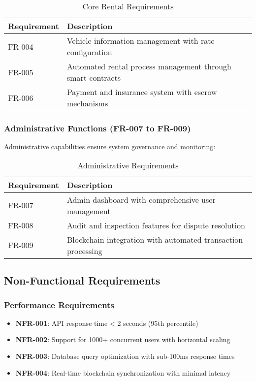 \documentclass[12pt,a4paper]{article}
\begin{document}
\begin{table}[H]
\centering
\begin{tabular}{|l|p{10cm}|}
\hline
\textbf{Requirement} & \textbf{Description} \\
\hline
FR-004 & Vehicle information management with rate configuration \\
FR-005 & Automated rental process management through smart contracts \\
FR-006 & Payment and insurance system with escrow mechanisms \\
\hline
\end{tabular}
\caption{Core Rental Requirements}
\end{table}

\subsubsection{Administrative Functions (FR-007 to FR-009)}
Administrative capabilities ensure system governance and monitoring:

\begin{table}[H]
\centering
\begin{tabular}{|l|p{10cm}|}
\hline
\textbf{Requirement} & \textbf{Description} \\
\hline
FR-007 & Admin dashboard with comprehensive user management \\
FR-008 & Audit and inspection features for dispute resolution \\
FR-009 & Blockchain integration with automated transaction processing \\
\hline
\end{tabular}
\caption{Administrative Requirements}
\end{table}

\subsection{Non-Functional Requirements}

\subsubsection{Performance Requirements}
\begin{itemize}
    \item \textbf{NFR-001}: API response time < 2 seconds (95th percentile)
    \item \textbf{NFR-002}: Support for 1000+ concurrent users with horizontal scaling
    \item \textbf{NFR-003}: Database query optimization with sub-100ms response times
    \item \textbf{NFR-004}: Real-time blockchain synchronization with minimal latency
\end{itemize}
\end{document}
